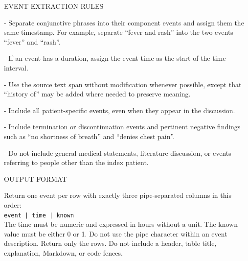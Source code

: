 \begin{tcolorbox}
EVENT EXTRACTION RULES


- Separate conjunctive phrases into their component events and assign them the same timestamp. For example, separate ``fever and rash'' into the two events ``fever'' and ``rash''.

- If an event has a duration, assign the event time as the start of the time interval.

- Use the source text span without modification whenever possible, except that ``history of'' may be added where needed to preserve meaning.

- Include all patient-specific events, even when they appear in the discussion.

- Include termination or discontinuation events and pertinent negative findings such as ``no shortness of breath'' and ``denies chest pain''.

- Do not include general medical statements, literature discussion, or events referring to people other than the index patient.


OUTPUT FORMAT


Return one event per row with exactly three pipe-separated columns in this order:\\
\texttt{event | time | known} \\

The time must be numeric and expressed in hours without a unit. The known value must be either 0 or 1. Do not use the pipe character within an event description. Return only the rows. Do not include a header, table title, explanation, Markdown, or code fences.
\end{tcolorbox}


\begingroup\ChSixBegin







\endgroup
